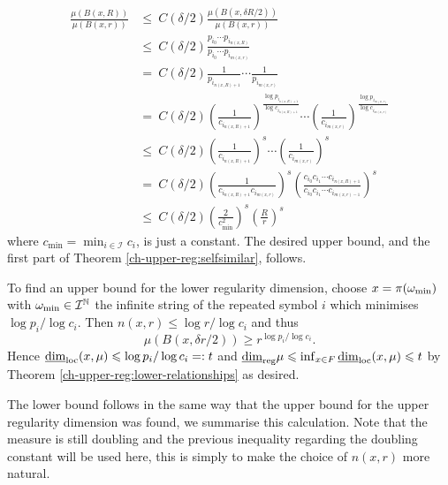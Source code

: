 \begin{align*}
\frac{\mu(B(x,R))}{\mu (B(x,r))}& \le \ C(\delta/2) \frac{\mu(B(x,\delta R/2))}{\mu (B(x,r))}  \\
& \le \ C(\delta/2) \frac{p_{i_0}\cdots p_{i_{n(x,R)}}}{p_{i_0}\cdots p_{i_{m(x,r)}}} \\
& =\  C(\delta/2)  \frac{1}{p_{i_{n(x,R)+1}}} \cdots \frac{1}{p_{i_{m(x,r)}}} \\
& = \ C(\delta/2)  \left(\frac{1}{c_{i_{n(x,R)+1}}}\right)^{\frac{\log p_{i_{n(x,R)+1}}}{\log c_{i_{n(x,R)+1}}} } \cdots \left(\frac{1}{c_{i_{m(x,r)}}}\right)^{\frac{\log p_{i_{m(x,r)}}}{\log c_{i_{m(x,r)} }}} \\
& \le\  C(\delta/2)  \left( \frac{1}{c_{i_{n(x,R)+1}}}\right)^s \cdots \left( \frac{1}{c_{i_{m(x,r)}}}\right)^s \\
& = \ C(\delta/2)  \left(\frac{1}{c_{i_{n(x,R)+1}} c_{i_{m(x,r)}}}\right)^s \left( \frac{c_{i_0}c_{i_1} \cdots c_{i_{n(x,R)+1}}}{c_{i_0}c_{i_1} \cdots c_{i_{m(x,r)-1}}}\right)^s \\
& \le \  C(\delta/2)   \left(\frac{2}{c_{\min}^2}\right)^s \left( \frac{R}{r}\right)^s
\end{align*}
where $c_{\min} = \min_{i\in \mathcal{I}}c_i$, is just a constant. The desired upper bound, and the first part of Theorem \ref{ch-upper-reg:selfsimilar}, follows.


To find an upper bound for the lower regularity dimension, choose $x = \pi (\omega_\textup{min})$ with $\omega_\textup{min} \in \mathcal{I}^{\mathbb{N}}$ the infinite string of the repeated symbol $i$ which minimises $\log p_i / \log c_i$. Then $n(x,r) \le  \log r / \log c_i$ and thus
\[
\mu(B(x,\delta r / 2)) \ge r^{\log p_i / \log c_i}.
\]
Hence $\underline{\dim}_{\textup{loc}}(x,\mu) \leqslant \log p_i/\log c_i =: t$ and $\underline{\dim}_{\textup{reg}} \mu \leqslant \inf_{x\in F} \underline{\dim}_{\textup{loc}}(x,\mu) \leqslant t$ by Theorem \ref{ch-upper-reg:lower-relationships} as desired.

The lower bound follows in the same way that the upper bound for the upper regularity dimension was found, we summarise this calculation. Note that the measure is still doubling and the previous inequality regarding the doubling constant will be used here, this is simply to make the choice of $n(x,r)$ more natural.

